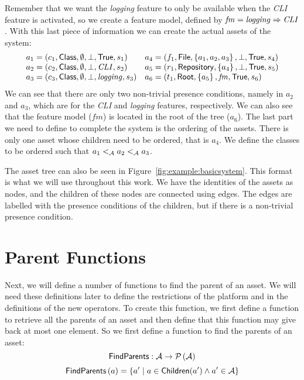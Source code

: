 Remember that we want the \emph{logging} feature to only be
available when the \emph{CLI} feature is activated, so we create a feature model,
defined by \( \mathit{fm} = \mathit{logging} \Rightarrow \mathit{CLI} \).
With this last piece of information we can create the actual assets of the system:
\[
  \begin{array}{ll}
    a_1 = \left( c_1, {\sf Class}, \emptyset, \bot, {\sf True}, s_1 \right) & a_4 = \left( f_1, {\sf File}, \left\{ a_1, a_2, a_3 \right\}, \bot, {\sf True}, s_4 \right) \\
    a_2 = \left( c_2, {\sf Class}, \emptyset, \bot, \mathit{CLI}, s_2 \right) & a_5 = \left( r_1, {\sf Repository}, \left\{ a_4 \right\}, \bot, {\sf True}, s_5 \right)\\
    a_3 = \left( c_3, {\sf Class}, \emptyset, \bot, \mathit{logging}, s_3 \right) & a_6 = \left( t_1, {\sf Root}, \left\{ a_5 \right\}, \mathit{fm}, {\sf True}, s_6 \right)
  \end{array}
\]
We can see that there are only two non-trivial presence conditions, namely in
$a_2$ and $a_3$, which are for the \emph{CLI} and \emph{logging} features,
respectively. We can also see that the feature model (\(\mathit{fm}\)) is
located in the root of the tree ($a_6$). The last part we need to define to
complete the system is the ordering of the assets. There is only one asset
whose children need to be ordered, that is $a_4$. We define the classes to be
ordered such that \(a_1 <_{\mathcal{A}} a_2 <_{\mathcal{A}} a_3 \).

The asset tree can also be seen in Figure~\ref{fig:example:basicsystem}. This
format is what we will use throughout this work. We have the identities of the
assets as nodes, and the children of these nodes are connected using edges. The edges
are labelled with the presence conditions of the children, but if there is a
non-trivial presence condition.

\section{Parent Functions}\label{sec:vp:parentsfunctions}
Next, we will define a number of functions to find the parent of an asset.
We will need these definitions later to define the restrictions of the platform
and in the definitions of the new operators.
To create this function, we first define a function to retrieve all the parents of an
asset and then define that this function may give back at most one element.
So we first define a function to find the parents of an asset:
\[
  {\sf FindParents} : \mathcal{A} \rightarrow \mathcal{P} \left(\mathcal{A}\right)
\]
\[
  {\sf FindParents} \left( a \right) = \left\{ a' \hspace*{1mm} \middle| \hspace*{1mm} a \in {\sf Children}(a') \land a' \in \mathcal{A} \right\}
\]

